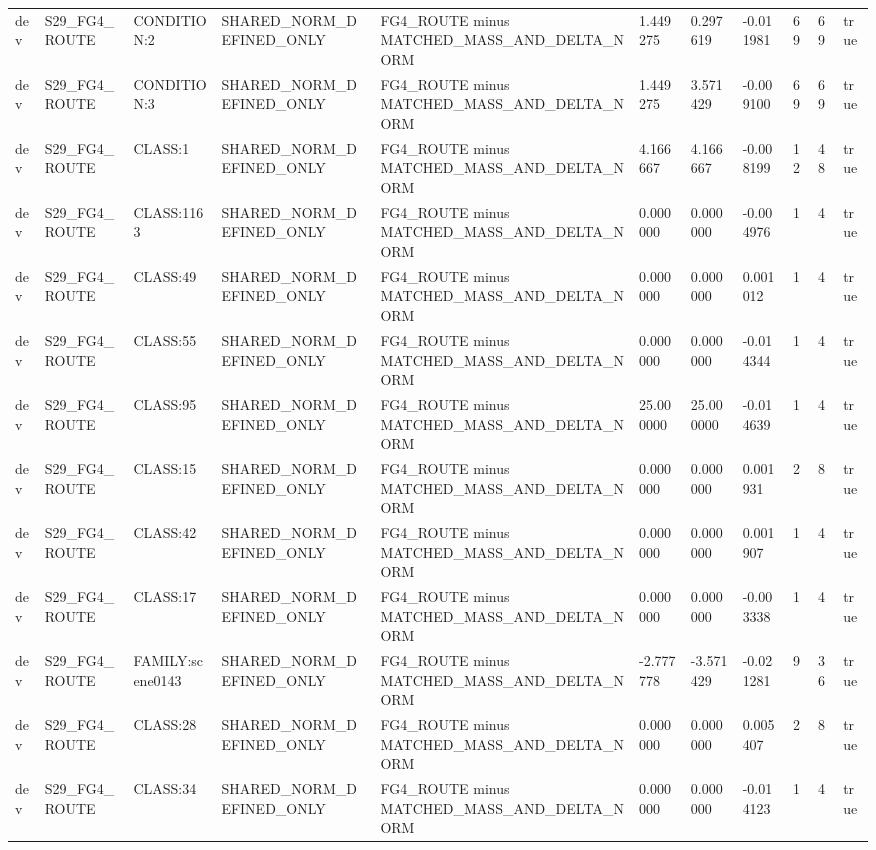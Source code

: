 \begin{tabular}{lllllllllll}
dev & S29\_FG4\_ROUTE & CONDITION:2 & SHARED\_NORM\_DEFINED\_ONLY & FG4\_ROUTE minus MATCHED\_MASS\_AND\_DELTA\_NORM & 1.449275 & 0.297619 & -0.011981 & 69 & 69 & true \\
dev & S29\_FG4\_ROUTE & CONDITION:3 & SHARED\_NORM\_DEFINED\_ONLY & FG4\_ROUTE minus MATCHED\_MASS\_AND\_DELTA\_NORM & 1.449275 & 3.571429 & -0.009100 & 69 & 69 & true \\
dev & S29\_FG4\_ROUTE & CLASS:1 & SHARED\_NORM\_DEFINED\_ONLY & FG4\_ROUTE minus MATCHED\_MASS\_AND\_DELTA\_NORM & 4.166667 & 4.166667 & -0.008199 & 12 & 48 & true \\
dev & S29\_FG4\_ROUTE & CLASS:1163 & SHARED\_NORM\_DEFINED\_ONLY & FG4\_ROUTE minus MATCHED\_MASS\_AND\_DELTA\_NORM & 0.000000 & 0.000000 & -0.004976 & 1 & 4 & true \\
dev & S29\_FG4\_ROUTE & CLASS:49 & SHARED\_NORM\_DEFINED\_ONLY & FG4\_ROUTE minus MATCHED\_MASS\_AND\_DELTA\_NORM & 0.000000 & 0.000000 & 0.001012 & 1 & 4 & true \\
dev & S29\_FG4\_ROUTE & CLASS:55 & SHARED\_NORM\_DEFINED\_ONLY & FG4\_ROUTE minus MATCHED\_MASS\_AND\_DELTA\_NORM & 0.000000 & 0.000000 & -0.014344 & 1 & 4 & true \\
dev & S29\_FG4\_ROUTE & CLASS:95 & SHARED\_NORM\_DEFINED\_ONLY & FG4\_ROUTE minus MATCHED\_MASS\_AND\_DELTA\_NORM & 25.000000 & 25.000000 & -0.014639 & 1 & 4 & true \\
dev & S29\_FG4\_ROUTE & CLASS:15 & SHARED\_NORM\_DEFINED\_ONLY & FG4\_ROUTE minus MATCHED\_MASS\_AND\_DELTA\_NORM & 0.000000 & 0.000000 & 0.001931 & 2 & 8 & true \\
dev & S29\_FG4\_ROUTE & CLASS:42 & SHARED\_NORM\_DEFINED\_ONLY & FG4\_ROUTE minus MATCHED\_MASS\_AND\_DELTA\_NORM & 0.000000 & 0.000000 & 0.001907 & 1 & 4 & true \\
dev & S29\_FG4\_ROUTE & CLASS:17 & SHARED\_NORM\_DEFINED\_ONLY & FG4\_ROUTE minus MATCHED\_MASS\_AND\_DELTA\_NORM & 0.000000 & 0.000000 & -0.003338 & 1 & 4 & true \\
dev & S29\_FG4\_ROUTE & FAMILY:scene0143 & SHARED\_NORM\_DEFINED\_ONLY & FG4\_ROUTE minus MATCHED\_MASS\_AND\_DELTA\_NORM & -2.777778 & -3.571429 & -0.021281 & 9 & 36 & true \\
dev & S29\_FG4\_ROUTE & CLASS:28 & SHARED\_NORM\_DEFINED\_ONLY & FG4\_ROUTE minus MATCHED\_MASS\_AND\_DELTA\_NORM & 0.000000 & 0.000000 & 0.005407 & 2 & 8 & true \\
dev & S29\_FG4\_ROUTE & CLASS:34 & SHARED\_NORM\_DEFINED\_ONLY & FG4\_ROUTE minus MATCHED\_MASS\_AND\_DELTA\_NORM & 0.000000 & 0.000000 & -0.014123 & 1 & 4 & true \\

\end{tabular}
